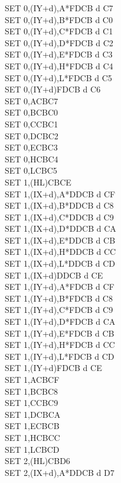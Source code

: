 \documentclass[oneside,a4paper]{book}
\begin{document}
\begin{multicols}{3}
{\begin{tabbing}
SET 0,(IY+d),A*\>FDCB d C7\\
SET 0,(IY+d),B*\>FDCB d C0\\
SET 0,(IY+d),C*\>FDCB d C1\\
SET 0,(IY+d),D*\>FDCB d C2\\
SET 0,(IY+d),E*\>FDCB d C3\\
SET 0,(IY+d),H*\>FDCB d C4\\
SET 0,(IY+d),L*\>FDCB d C5\\
SET 0,(IY+d)\>FDCB d C6\\
SET 0,A\>CBC7\\
SET 0,B\>CBC0\\
SET 0,C\>CBC1\\
SET 0,D\>CBC2\\
SET 0,E\>CBC3\\
SET 0,H\>CBC4\\
SET 0,L\>CBC5\\
SET 1,(HL)\>CBCE\\
SET 1,(IX+d),A*\>DDCB d CF\\
SET 1,(IX+d),B*\>DDCB d C8\\
SET 1,(IX+d),C*\>DDCB d C9\\
SET 1,(IX+d),D*\>DDCB d CA\\
SET 1,(IX+d),E*\>DDCB d CB\\
SET 1,(IX+d),H*\>DDCB d CC\\
SET 1,(IX+d),L*\>DDCB d CD\\
SET 1,(IX+d)\>DDCB d CE\\
SET 1,(IY+d),A*\>FDCB d CF\\
SET 1,(IY+d),B*\>FDCB d C8\\
SET 1,(IY+d),C*\>FDCB d C9\\
SET 1,(IY+d),D*\>FDCB d CA\\
SET 1,(IY+d),E*\>FDCB d CB\\
SET 1,(IY+d),H*\>FDCB d CC\\
SET 1,(IY+d),L*\>FDCB d CD\\
SET 1,(IY+d)\>FDCB d CE\\
SET 1,A\>CBCF\\
SET 1,B\>CBC8\\
SET 1,C\>CBC9\\
SET 1,D\>CBCA\\
SET 1,E\>CBCB\\
SET 1,H\>CBCC\\
SET 1,L\>CBCD\\
SET 2,(HL)\>CBD6\\
SET 2,(IX+d),A*\>DDCB d D7\\

\end{tabbing}}
\end{multicols}
\end{document}
